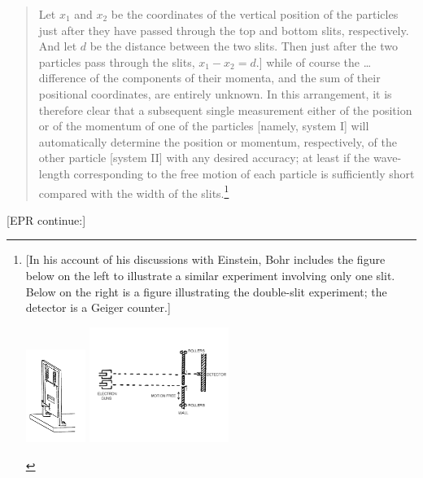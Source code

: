 \begin{quote}
{  Let $x_1$ and $x_2$ be the coordinates of the vertical
  position of the particles just after they have passed through the top
  and bottom slits, respectively. And let $d$ be the distance
  between the two slits. Then just after the two particles pass through
  the slits, $x_1 - x_2 = d$.]\label{entangle}} while of course the
\ldots\,difference of the components of their momenta, and the sum of
their positional coordinates, are entirely unknown. In this arrangement,
it is therefore clear that a subsequent single measurement either of the
position or of the momentum of one of the particles {[}namely, system
I{]} will automatically determine the position or momentum,
respectively, of the other particle {[}system II{]} with any desired
accuracy; at least if the wave-length corresponding to the free motion
of each particle is sufficiently short compared with the width of the
slits.\footnote{{[}In his account of his discussions with Einstein, Bohr
  includes the figure below on the left to illustrate a similar
  experiment involving only one slit. Below on the right is a figure
  illustrating the double-slit experiment; the detector is a Geiger
  counter.{]}
\begin{center}
\includegraphics[width=0.76944in,height=1.19236in]{images/16_epr/image017.png}
\includegraphics[width=1.77833in,height=1.475in]{images/16_epr/image019.png}
\end{center}
}
\end{quote}
[EPR continue:]

